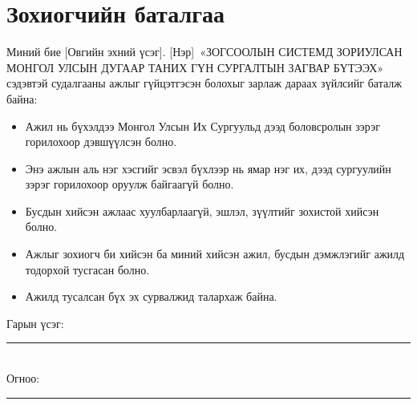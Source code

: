 \documentclass[12pt,a4paper,oneside]{report}
\newcommand{\studentname}{[Овгийн эхний үсэг]. [Нэр]}
\newcommand{\titlemn}{ЗОГСООЛЫН СИСТЕМД ЗОРИУЛСАН МОНГОЛ УЛСЫН ДУГААР ТАНИХ ГҮН СУРГАЛТЫН ЗАГВАР БҮТЭЭХ}
\begin{document}
\chapter*{Зохиогчийн баталгаа}
Миний бие \studentname\ «\titlemn» сэдэвтэй судалгааны ажлыг гүйцэтгэсэн болохыг зарлаж дараах зүйлсийг баталж байна:
\begin{itemize}[leftmargin=2em]
\item Ажил нь бүхэлдээ Монгол Улсын Их Сургуульд дээд боловсролын зэрэг горилохоор дэвшүүлсэн болно.
\item Энэ ажлын аль нэг хэсгийг эсвэл бүхлээр нь ямар нэг их, дээд сургуулийн зэрэг горилохоор оруулж байгаагүй болно.
\item Бусдын хийсэн ажлаас хуулбарлаагүй, эшлэл, зүүлтийг зохистой хийсэн болно.
\item Ажлыг зохиогч би хийсэн ба миний хийсэн ажил, бусдын дэмжлэгийг ажилд тодорхой тусгасан болно.
\item Ажилд тусалсан бүх эх сурвалжид талархаж байна.
\end{itemize}
\vspace{1em}Гарын үсэг: \rule{5cm}{0.4pt}\\[0.6em] Огноо: \rule{3cm}{0.4pt}
\clearpage
\tableofcontents\clearpage
\listoffigures\clearpage
\listoftables\clearpage
{}








\appendix

\end{document}
